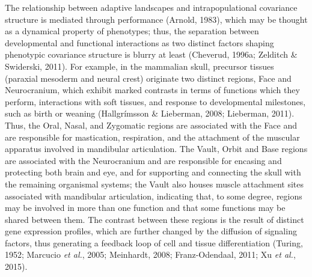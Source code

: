 \documentclass[12pt,twoside]{report}
\begin{document}
The relationship between adaptive landscapes and intrapopulational
covariance structure is mediated through performance (Arnold, 1983),
which may be thought as a dynamical property of phenotypes; thus, the
separation between developmental and functional interactions as two
distinct factors shaping phenotypic covariance structure is blurry at
least (Cheverud, 1996a; Zelditch \& Swiderski, 2011). For example, in
the mammalian skull, precursor tissues (paraxial mesoderm and neural
crest) originate two distinct regions, Face and Neurocranium, which
exhibit marked contrasts in terms of functions which they perform,
interactions with soft tissues, and response to developmental
milestones, such as birth or weaning (Hallgrímsson \& Lieberman, 2008;
Lieberman, 2011). Thus, the Oral, Nasal, and Zygomatic regions are
associated with the Face and are responsible for mastication,
respiration, and the attachment of the muscular apparatus involved in
mandibular articulation. The Vault, Orbit and Base regions are
associated with the Neurocranium and are responsible for encasing and
protecting both brain and eye, and for supporting and connecting the
skull with the remaining organismal systems; the Vault also houses
muscle attachment sites associated with mandibular articulation,
indicating that, to some degree, regions may be involved in more than
one function and that some functions may be shared between them. The
contrast between these regions is the result of distinct gene expression
profiles, which are further changed by the diffusion of signaling
factors, thus generating a feedback loop of cell and tissue
differentiation (Turing, 1952; Marcucio \emph{et al.}, 2005; Meinhardt,
2008; Franz-Odendaal, 2011; Xu \emph{et al.}, 2015).
\end{document}

